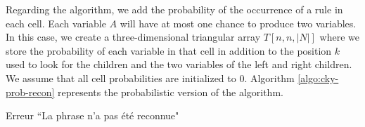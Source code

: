 \documentclass{KodeBook}
\begin{document}
Regarding the  algorithm, we add the probability of the occurrence of a rule in each cell.
Each variable $A$ will have at most one chance to produce two variables.
In this case, we create a three-dimensional triangular array $T[n, n, |N|]$ where we store the probability of each variable in that cell in addition to the position $k$ used to look for the children and the two variables of the left and right children.
We assume that all cell probabilities are initialized to $0$.
Algorithm \ref{algo:cky-prob-recon} represents the probabilistic version of the  algorithm.
\begin{algorithm}[ht]
	
	
	
	 {
		Erreur ``La phrase n'a pas été reconnue"\;
	}
	
	\caption{Reconnaissance d'une phrase en utilisant la méthode CKY probabiliste}
	\label{algo:cky-prob-recon}
\end{algorithm}
%	
%	
%	
%	
\end{document}

